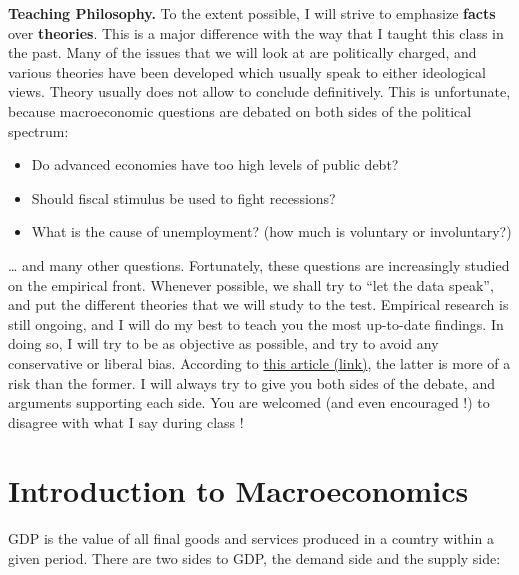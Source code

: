 \documentclass[]{book}
\providecommand{\tightlist}{%
  \setlength{\itemsep}{0pt}\setlength{\parskip}{0pt}}
\theoremstyle{definition}
\theoremstyle{definition}
\theoremstyle{definition}
\theoremstyle{remark}
\begin{document}
\textbf{Teaching Philosophy.} To the extent possible, I will strive to
emphasize \textbf{facts} over \textbf{theories}. This is a major
difference with the way that I taught this class in the past. Many of
the issues that we will look at are politically charged, and various
theories have been developed which usually speak to either ideological
views. Theory usually does not allow to conclude definitively. This is
unfortunate, because macroeconomic questions are debated on both sides
of the political spectrum:

\begin{itemize}
\tightlist
\item
  Do advanced economies have too high levels of public debt?
\item
  Should fiscal stimulus be used to fight recessions?
\item
  What is the cause of unemployment? (how much is voluntary or
  involuntary?)
\end{itemize}

\ldots{} and many other questions. Fortunately, these questions are
increasingly studied on the empirical front. Whenever possible, we shall
try to ``let the data speak'', and put the different theories that we
will study to the test. Empirical research is still ongoing, and I will
do my best to teach you the most up-to-date findings. In doing so, I
will try to be as objective as possible, and try to avoid any
conservative or liberal bias. According to
\href{https://www.bloomberg.com/view/articles/2018-09-17/colleges-have-way-too-many-liberal-professors}{this
article (link)}, the latter is more of a risk than the former. I will
always try to give you both sides of the debate, and arguments
supporting each side. You are welcomed (and even encouraged !) to
disagree with what I say during class !

\chapter{Introduction to Macroeconomics}\label{lecture-intro-cobb}

GDP is the value of all final goods and services produced in a country
within a given period. There are two sides to GDP, the demand side and
the supply side:
\end{document}
